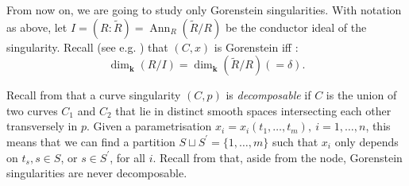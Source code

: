 \documentclass[11pt]{amsart}
\renewcommand{\k}{\mathbf k}
\newcommand{\tR}{\widetilde{R}}
\theoremstyle{plain}
\theoremstyle{definition}
\begin{document}
From now on, we are going to study only Gorenstein singularities. With notation as above, let $I=(R:\tilde R)=\operatorname{Ann}_R(\tilde R/R)$ be the conductor ideal of the singularity. Recall (see e.g. \cite[Theorem 6.4]{Hun}) that $(C,x)$ is Gorenstein iff :
\[\dim_\k(R/I)=\dim_\k(\tR/R)(=\delta).\]

Recall from \cite[Definition 2-1]{Stev} that a curve singularity $(C,p)$ is \emph{decomposable} if $C$ is the union of two curves $C_1$ and $C_2$ that lie in distinct smooth spaces intersecting each other transversely in $p$. Given a parametrisation $x_i=x_i(t_1,\ldots,t_m),\ i=1,\ldots,n$, this means that we can find a partition $S\sqcup S^\prime=\{1,\ldots,m\}$ such that $x_i$ only depends on $t_s,s\in S$, or $s\in S^\prime$, for all $i$. Recall from \cite[Proposition 2.1]{AFSGm} that, aside from the node, Gorenstein singularities are never decomposable.
\end{document}
